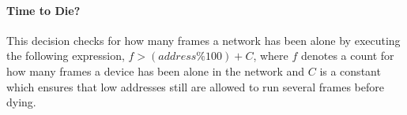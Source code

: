 \paragraph{Time to Die?}
This decision checks for how many frames a network has been alone by executing the following expression, $f > (address \% 100) + C$, where $f$ denotes a count for how many frames a device has been alone in the network and $C$ is a constant which ensures that low addresses still are allowed to run several frames before dying.
